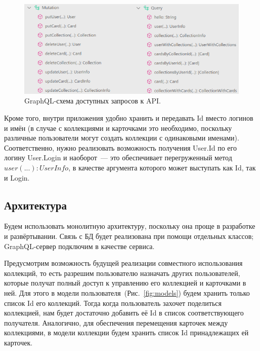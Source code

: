\documentclass[14pt]{matmex-diploma-custom}
\begin{document}
\begin{figure}[ht]
    \includegraphics[width=\textwidth]{Schema}
    \caption{GraphQL-схема доступных запросов к API.}
    \label{fig:schema}
\end{figure}

Кроме того, внутри приложения удобно хранить и передавать Id вместо логинов и имён (в случае с коллекциями и карточками это необходимо, поскольку различные пользователи могут создать коллекции с одинаковыми именами). Соответственно, нужно реализовать возможность получения User.Id по его логину User.Login и наоборот~--- это обеспечивает перегруженный метод $user(...): UserInfo$, в качестве аргумента которого может выступать как Id, так и Login.

\subsection{Архитектура} \label{arch}
Будем использовать монолитную архитектуру, поскольку она проще в разработке и развёртывании. Связь с БД будет реализована при помощи отдельных классов; GraphQL-сервер подключим в качестве сервиса.

Предусмотрим возможность будущей реализации совместного использования коллекций, то есть разрешим пользователю назначать других пользователей, которые получат полный доступ к управлению его коллекцией и карточками в ней. Для этого в модели пользователя~(Рис.~\ref{fig:models}) будем хранить только список Id его коллекций. Тогда когда пользователь захочет поделиться коллекцией, нам будет достаточно добавить её Id в список соответствующего получателя. Аналогично, для обеспечения перемещения карточек между коллекциями, в модели коллекции будем хранить список Id принадлежащих ей карточек.

\end{document}
